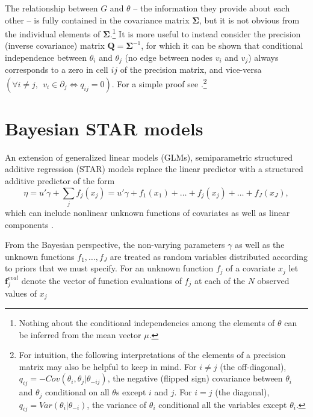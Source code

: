 The relationship between $G$ and $\theta$ -- the information they provide about each other -- is fully contained in the covariance matrix $\boldsymbol{\Sigma}$, but it is not obvious from the individual elements of $\boldsymbol{\Sigma}$.\footnote{Nothing about the conditional independencies among the elements of $\theta$ can be inferred from the mean vector $\mu$.} It is more useful to instead consider the precision (inverse covariance) matrix $\mathbf{Q}=\boldsymbol{\Sigma}^{-1}$, for which it can be shown that conditional independence between $\theta_i$ and $\theta_j$ (no edge between nodes $v_i$ and $v_j$) always corresponds to a zero in cell $ij$ of the precision matrix, and vice-versa $(\forall i \neq j, \:\: v_i \in \partial_j \iff q_{ij} = 0)$.  For a simple proof see .\footnote{For intuition, the following interpretations of the elements of a precision matrix may also be helpful to keep in mind. For $i \neq j$ (the off-diagonal), $q_{ij}  = -Cov(\theta_i, \theta_j | \theta_{-ij}) $, the negative (flipped sign) covariance between $\theta_i$ and $\theta_j$ conditional on all $\theta$s except $i$ and $j$.  For $i = j$ (the diagonal),  $q_{ij} = Var(\theta_i | \theta_{-i})$, the variance of $\theta_i$ conditional all the variables except $\theta_i$.}






\section{Bayesian STAR models}
\label{star}

An extension of generalized linear models (GLMs), semiparametric structured additive regression (STAR) models replace the linear predictor with a structured additive predictor of the form
%
\begin{equation*}
\eta =  u'\gamma + \sum_{j} f_j (x_j) =  u'\gamma + f_1(x_1) + \ldots + f_j(x_j) + \ldots + f_J(x_J),
\end{equation*}
%
\noindent which can include nonlinear unknown functions of covariates as well as linear components . 

From the Bayesian perspective, the non-varying parameters $\gamma$ as well as the unknown functions $f_1, \dots, f_J$ are treated as random variables distributed according to priors that we must specify. For an unknown function $f_j$ of a covariate $x_j$ let $\mathbf{f}_j^{eval}$ denote the vector of function evaluations of $f_j$ at each of the $N$ observed values of $x_j$ 

